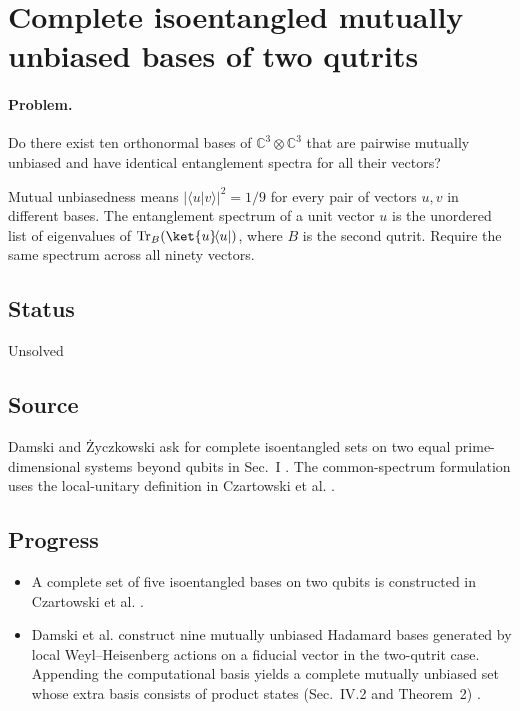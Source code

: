 \section{Complete isoentangled mutually unbiased bases of two qutrits}
\label{sec:op_01b6d53b3c2b1ef9}

\paragraph{Problem.}
Do there exist ten orthonormal bases of $\mathbb C^3\otimes\mathbb C^3$ that are pairwise mutually unbiased and have identical entanglement spectra for all their vectors?

Mutual unbiasedness means $|\langle u|v\rangle|^2=1/9$ for every pair of vectors $u,v$ in different bases. The entanglement spectrum of a unit vector $u$ is the unordered list of eigenvalues of $\operatorname{Tr}_B(\ket{u}\!\langle u\rvert)$, where $B$ is the second qutrit. Require the same spectrum across all ninety vectors.

\subsection*{Status}

Unsolved

\subsection*{Source}

Damski and Życzkowski ask for complete isoentangled sets on two equal prime-dimensional systems beyond qubits in Sec.~I . The common-spectrum formulation uses the local-unitary definition in Czartowski et al. .

\subsection*{Progress}

\begin{itemize}
  \item A complete set of five isoentangled bases on two qubits is constructed in Czartowski et al. .

  \item Damski et al. construct nine mutually unbiased Hadamard bases generated by local Weyl--Heisenberg actions on a fiducial vector in the two-qutrit case. Appending the computational basis yields a complete mutually unbiased set whose extra basis consists of product states (Sec.~IV.2 and Theorem~2) .
\end{itemize}

